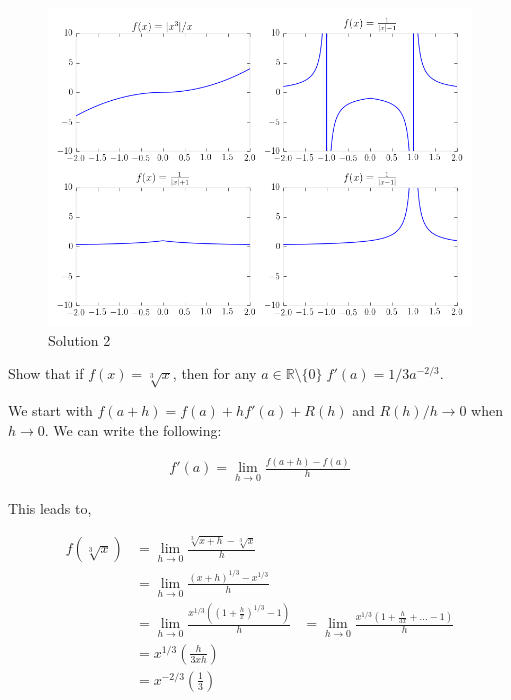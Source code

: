 \documentclass[answers,addpoints]{exam}
\begin{document}
\begin{questions}
\begin{solution}
        \begin{figure}[H]
            \begin{center}
                \includegraphics[width=1\textwidth]{solution2.png}
            \end{center}
            \caption{Solution 2}
            \label{fig:sol2}
        \end{figure}

    \end{solution}

    \question[5]

    Show that if $f(x) = \sqrt[3]{x}$, then for any $a \in \mathbb{R} \setminus
    \{0\}\; f'(a) = 1/3a^{-2/3}$.

    \begin{solution}

        We start with $f(a+h) = f(a) + h f'(a) + R(h)$ and $R(h)/h
        \rightarrow 0$ when $h \rightarrow 0$. We can write the following:

        \begin{align}
            f'(a)  = \lim_{h \rightarrow 0} \frac{ f(a+h) - f(a) }{h}  
        \end{align}

        This leads to,

        \begin{align}
            f(\sqrt[3]{x}) &= \lim_{h \rightarrow 0} \frac{ \sqrt[3]{x+h} - \sqrt[3]{x} }{h}  \\
                           &= \lim_{h \rightarrow 0} \frac{ (x+h)^{1/3} - x^{1/3} }{h} \\
                           &= \lim_{h \rightarrow 0} \frac{ x^{1/3} \left( 
        \left( 1 + \frac{h}{x}  \right)^{1/3} -1 \right)  }{h}
                           &= \lim_{h \rightarrow 0} \frac{ x^{1/3} \left( 
        1 + \frac{h}{3x} + \ldots  -1 \right)  }{h} \\
                            &= x^{1/3} \left( \frac{h}{3xh} \right) \\
                            &= x^{-2/3} \left( \frac{1}{3} \right) 
        \end{align}


    \end{solution}

\end{questions}
\end{document}
